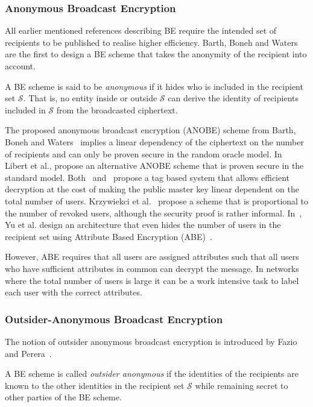 \subsubsection{Anonymous Broadcast Encryption}
\label{sec:anobe}
All earlier mentioned references describing BE require the intended set of recipients to be published to realise higher efficiency. Barth, Boneh and Waters~\cite{art:BarthBW06} are the first to design a BE scheme that takes the anonymity of the recipient into account.
\begin{defn}[Anonymity]
\label{def:anonymity}
 A BE scheme is said to be \textit{anonymous} if it hides who is included in the recipient set $\mathcal{S}$. That is, no entity inside or outside $\mathcal{S}$ can derive the identity of recipients included in $\mathcal{S}$ from the broadcasted ciphertext.
\end{defn}

The proposed anonymous broadcast encryption (ANOBE) scheme  from Barth, Boneh and Waters~\cite{art:BarthBW06} implies a linear dependency of the ciphertext on the number of recipients and can only be proven secure in the random oracle model. In~\cite{art:LibertPQ12} Libert et al., propose an alternative ANOBE scheme that is proven secure in the standard model. Both~\cite{art:BarthBW06} and~\cite{art:LibertPQ12} propose a tag based system that allows efficient decryption at the cost of making the public master key linear dependent on the total number of users. Krzywiekci et al.~\cite{art:KrzywieckiKK06} propose a scheme that is proportional to the number of revoked users, although the security proof is rather informal. In~\cite{art:YuRL10}, Yu et al. design an architecture that even hides the number of users in the recipient set using Attribute Based Encryption (ABE)~\cite{art:SahaiW04}.

However, ABE requires that all users are assigned attributes such that all users who have sufficient attributes in common can decrypt the message. In networks where the total number of users is large it can be a work intensive task to label each user with the correct attributes.

\subsubsection{Outsider-Anonymous Broadcast Encryption}
The notion of outsider anonymous broadcast encryption is introduced by Fazio and Perera~\cite{art:FazioP12}.
\begin{defn}
\label{def:outsider_anonymity}
 A BE scheme is called \textit{outsider anonymous} if the identities of the recipients are known to the other identities in the recipient set $\mathcal{S}$ while remaining secret to other parties of the BE scheme.
\end{defn}

